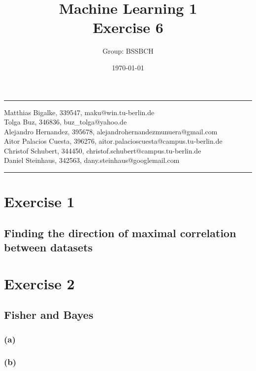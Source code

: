 \documentclass{article}
\title{Machine Learning 1 \\ Exercise 6} %
\author{Group: BSSBCH} %
\date{\today} %
\begin{document}
\maketitle %
\noindent\rule[0.5ex]{\linewidth}{1pt}
Matthias Bigalke, 339547, maku@win.tu-berlin.de \\
Tolga Buz, 346836, buz\_tolga@yahoo.de \\
Alejandro Hernandez, 395678, alejandrohernandezmunuera@gmail.com \\
Aitor Palacios Cuesta, 396276, aitor.palacioscuesta@campus.tu-berlin.de \\
Christof Schubert, 344450, christof.schubert@campus.tu-berlin.de \\
Daniel Steinhaus, 342563, dany.steinhaus@googlemail.com\\
\noindent\rule[0.5ex]{\linewidth}{1pt}


\section*{Exercise 1}

\subsection*{Finding the direction of maximal correlation between datasets}

\section*{Exercise 2}
\subsection*{Fisher and Bayes}
\subsubsection*{(a)}

\subsubsection*{(b)}
\end{document}
